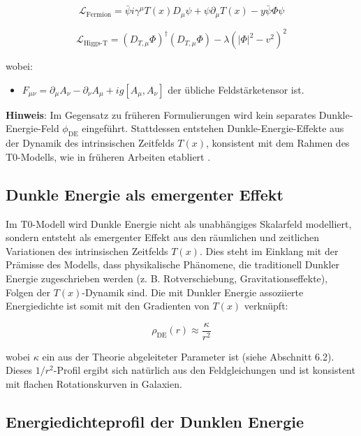 \documentclass[a4paper,12pt]{article}
\theoremstyle{definition}
\theoremstyle{remark}
\newcommand{\Tfield}{T(x)} %
\newcommand{\DcovT}[1]{\Tfield D_\mu #1 + #1 \partial_\mu \Tfield}
\begin{document}
	\begin{equation}
		\mathcal{L}_{\text{Fermion}} = \bar{\psi}i\gamma^\mu \DcovT{\psi} - y\bar{\psi}\Phi\psi
	\end{equation}
	
	\begin{equation}
		\mathcal{L}_{\text{Higgs-T}} = (D_{T,\mu}\Phi)^\dagger (D_{T,\mu}\Phi) - \lambda(|\Phi|^2 - v^2)^2
	\end{equation}
	
	wobei:
	\begin{itemize}
		\item \(F_{\mu\nu} = \partial_\mu A_\nu - \partial_\nu A_\mu + ig[A_\mu, A_\nu]\) der übliche Feldstärketensor ist.
	\end{itemize}
	
	\textbf{Hinweis}: Im Gegensatz zu früheren Formulierungen wird kein separates Dunkle-Energie-Feld \(\phi_{\text{DE}}\) eingeführt. Stattdessen entstehen Dunkle-Energie-Effekte aus der Dynamik des intrinsischen Zeitfelds \(\Tfield\), konsistent mit dem Rahmen des T0-Modells, wie in früheren Arbeiten etabliert \cite{pascher_galaxies_2025, pascher_messdifferenzen_2025}.
	
	\subsection{Dunkle Energie als emergenter Effekt}
	
	Im T0-Modell wird Dunkle Energie nicht als unabhängiges Skalarfeld modelliert, sondern entsteht als emergenter Effekt aus den räumlichen und zeitlichen Variationen des intrinsischen Zeitfelds \(\Tfield\). Dies steht im Einklang mit der Prämisse des Modells, dass physikalische Phänomene, die traditionell Dunkler Energie zugeschrieben werden (z. B. Rotverschiebung, Gravitationseffekte), Folgen der \(\Tfield\)-Dynamik sind. Die mit Dunkler Energie assoziierte Energiedichte ist somit mit den Gradienten von \(\Tfield\) verknüpft:
	
	\begin{equation}
		\rho_{\text{DE}}(r) \approx \frac{\kappa}{r^2}
	\end{equation}
	
	wobei \(\kappa\) ein aus der Theorie abgeleiteter Parameter ist (siehe Abschnitt 6.2). Dieses \(1/r^2\)-Profil ergibt sich natürlich aus den Feldgleichungen und ist konsistent mit flachen Rotationskurven in Galaxien.
	
	\subsection{Energiedichteprofil der Dunklen Energie}
	
\end{document}
